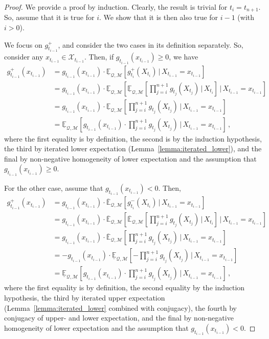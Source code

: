 \documentclass[twoside,11pt]{article}
\newcommand{\states}{\mathcal{X}}
\newcommand{\lexp}{\underline{\mathbb{E}}_{\rateset,\mathcal{M}}}
\newcommand{\uexp}{\overline{\mathbb{E}}_{\rateset,\mathcal{M}}}
\newcommand{\rateset}{\mathcal{Q}}
\begin{document}
\begin{proof}
We provide a proof by induction. Clearly, the result is trivial for $t_i=t_{n+1}$. So, assume that it is true for $i$. We show that it is then also true for $i-1$ (with $i>0$).

We focus on $g_{t_{i-1}}^+$, and consider the two cases in its definition separately. So, consider any $x_{t_{i-1}}\in\states_{t_{i-1}}$. Then, if $g_{t_{i-1}}(x_{t_{i-1}})\geq 0$, we have
\begin{align*}
g_{t_{i-1}}^+(x_{t_{i-1}}) &= g_{t_{i-1}}(x_{t_{i-1}})\cdot \lexp\left[g_{t_{i}}^+(X_{t_{i}})\,\vert\,X_{t_{i-1}}=x_{t_{i-1}}\right] \\
 &= g_{t_{i-1}}(x_{t_{i-1}})\cdot \lexp\left[\lexp\left[\prod_{j=i}^{n+1}g_{t_j}(X_{t_j})\,\vert\,X_{t_i}\right]\,\vert\,X_{t_{i-1}}=x_{t_{i-1}}\right] \\
 &= g_{t_{i-1}}(x_{t_{i-1}})\cdot \lexp\left[\prod_{j=i}^{n+1}g_{t_j}(X_{t_j})\,\vert\,X_{t_{i-1}}=x_{t_{i-1}}\right] \\ 
 &= \lexp\left[g_{t_{i-1}}(x_{t_{i-1}})\cdot\prod_{j=i}^{n+1}g_{t_j}(X_{t_j})\,\vert\,X_{t_{i-1}}=x_{t_{i-1}}\right]\,,
\end{align*}
where the first equality is by definition, the second is by the induction hypothesis, the third by iterated lower expectation (Lemma~\ref{lemma:iterated_lower}), and the final by non-negative homogeneity of lower expectation and the assumption that $g_{t_{i-1}}(x_{t_{i-1}})\geq 0$.

For the other case, assume that $g_{t_{i-1}}(x_{t_{i-1}})< 0$. Then,
\begin{align*}
g_{t_{i-1}}^+(x_{t_{i-1}}) &= g_{t_{i-1}}(x_{t_{i-1}})\cdot \uexp\left[g_{t_{i}}^-(X_{t_{i}})\,\vert\,X_{t_{i-1}}=x_{t_{i-1}}\right] \\
&= g_{t_{i-1}}(x_{t_{i-1}})\cdot \uexp\left[\uexp\left[\prod_{j=i}^{n+1}g_{t_j}(X_{t_j})\,\vert\,X_{t_i}\right]\,\vert\,X_{t_{i-1}}=x_{t_{i-1}}\right] \\
&= g_{t_{i-1}}(x_{t_{i-1}})\cdot \uexp\left[\prod_{j=i}^{n+1}g_{t_j}(X_{t_j})\,\vert\,X_{t_{i-1}}=x_{t_{i-1}}\right] \\
&= -g_{t_{i-1}}(x_{t_{i-1}})\cdot \lexp\left[-\prod_{j=i}^{n+1}g_{t_j}(X_{t_j})\,\vert\,X_{t_{i-1}}=x_{t_{i-1}}\right] \\
&= \lexp\left[g_{t_{i-1}}(x_{t_{i-1}})\cdot\prod_{j=i}^{n+1}g_{t_j}(X_{t_j})\,\vert\,X_{t_{i-1}}=x_{t_{i-1}}\right]\,,
\end{align*}
where the first equality is by definition, the second equality by the induction hypothesis, the third by iterated upper expectation (Lemma~\ref{lemma:iterated_lower} combined with conjugacy), the fourth by conjugacy of upper- and lower expectation, and the final by non-negative homogeneity of lower expectation and the assumption that $g_{t_{i-1}}(x_{t_{i-1}})<0$.


\end{proof}
\end{document}
